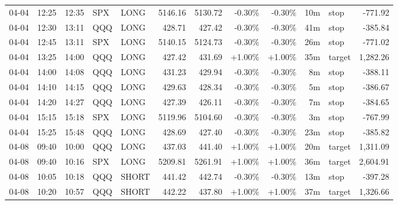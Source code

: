 \documentclass[11pt,a4paper,twoside]{article}
\begin{document}
\begin{center}
\begin{longtable}{>{\color{txtmain}}l l l l l r r r r r >{\color{txtmain}}l r}
04-04 & 12:25 & 12:35 & SPX & LONG & 5146.16 & 5130.72 & \textcolor{lossred}{-0.30\%} & \textcolor{lossred}{-0.30\%} & 10m & stop & \textcolor{lossred}{-771.92} \\
04-04 & 12:30 & 13:11 & QQQ & LONG & 428.71 & 427.42 & \textcolor{lossred}{-0.30\%} & \textcolor{lossred}{-0.30\%} & 41m & stop & \textcolor{lossred}{-385.84} \\
04-04 & 12:45 & 13:11 & SPX & LONG & 5140.15 & 5124.73 & \textcolor{lossred}{-0.30\%} & \textcolor{lossred}{-0.30\%} & 26m & stop & \textcolor{lossred}{-771.02} \\
04-04 & 13:25 & 14:00 & QQQ & LONG & 427.42 & 431.69 & \textcolor{wingreen}{+1.00\%} & \textcolor{wingreen}{+1.00\%} & 35m & target & \textcolor{wingreen}{1,282.26} \\
04-04 & 14:00 & 14:08 & QQQ & LONG & 431.23 & 429.94 & \textcolor{lossred}{-0.30\%} & \textcolor{lossred}{-0.30\%} & 8m & stop & \textcolor{lossred}{-388.11} \\
04-04 & 14:10 & 14:15 & QQQ & LONG & 429.63 & 428.34 & \textcolor{lossred}{-0.30\%} & \textcolor{lossred}{-0.30\%} & 5m & stop & \textcolor{lossred}{-386.67} \\
04-04 & 14:20 & 14:27 & QQQ & LONG & 427.39 & 426.11 & \textcolor{lossred}{-0.30\%} & \textcolor{lossred}{-0.30\%} & 7m & stop & \textcolor{lossred}{-384.65} \\
04-04 & 15:15 & 15:18 & SPX & LONG & 5119.96 & 5104.60 & \textcolor{lossred}{-0.30\%} & \textcolor{lossred}{-0.30\%} & 3m & stop & \textcolor{lossred}{-767.99} \\
04-04 & 15:25 & 15:48 & QQQ & LONG & 428.69 & 427.40 & \textcolor{lossred}{-0.30\%} & \textcolor{lossred}{-0.30\%} & 23m & stop & \textcolor{lossred}{-385.82} \\
04-08 & 09:40 & 10:00 & QQQ & LONG & 437.03 & 441.40 & \textcolor{wingreen}{+1.00\%} & \textcolor{wingreen}{+1.00\%} & 20m & target & \textcolor{wingreen}{1,311.09} \\
04-08 & 09:40 & 10:16 & SPX & LONG & 5209.81 & 5261.91 & \textcolor{wingreen}{+1.00\%} & \textcolor{wingreen}{+1.00\%} & 36m & target & \textcolor{wingreen}{2,604.91} \\
04-08 & 10:05 & 10:18 & QQQ & SHORT & 441.42 & 442.74 & \textcolor{lossred}{-0.30\%} & \textcolor{lossred}{-0.30\%} & 13m & stop & \textcolor{lossred}{-397.28} \\
04-08 & 10:20 & 10:57 & QQQ & SHORT & 442.22 & 437.80 & \textcolor{wingreen}{+1.00\%} & \textcolor{wingreen}{+1.00\%} & 37m & target & \textcolor{wingreen}{1,326.66} \\

\end{longtable}
\end{center}
\end{document}
